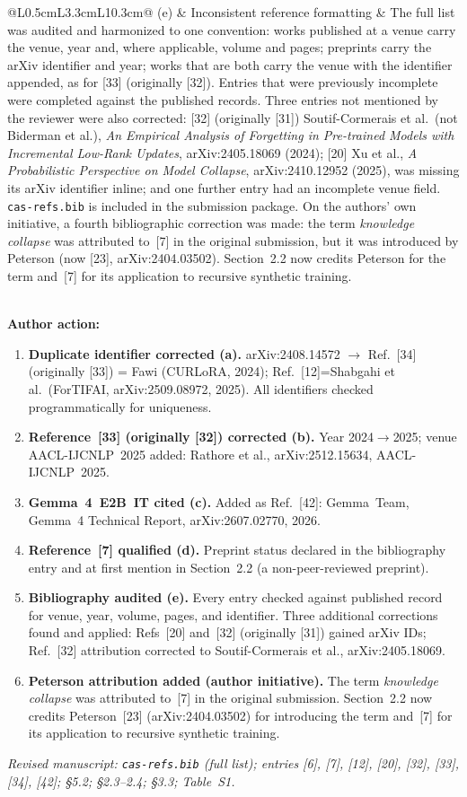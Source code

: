 \documentclass[11pt,a4paper]{article}
\newcommand{\newtext}[1]{#1}
\newcommand{\arhead}[1]{\medskip\noindent\textbf{#1}\par\smallskip}
\newcommand{\newtext}[1]{\textcolor{chgcolor}{``#1''}}
\newcommand{\msloc}[1]{%
  \smallskip\noindent\textit{Revised manuscript: #1}\par%
}
\begin{document}
\begin{longtable}{@{}L{0.5cm}L{3.3cm}L{10.3cm}@{}}
(e) & Inconsistent reference formatting &
The full list was audited and harmonized to one convention: works
published at a venue carry the venue, year and, where applicable, volume
and pages; preprints carry the arXiv identifier and year; works that are
both carry the venue with the identifier appended, as for [33] (originally [32]). Entries
that were previously incomplete were completed against the published
records. Three entries not mentioned by the reviewer were also corrected:
[32] (originally [31]) Soutif-Cormerais et al.\ (not Biderman et al.), \emph{An Empirical
Analysis of Forgetting in Pre-trained Models with Incremental Low-Rank
Updates}, arXiv:2405.18069 (2024); [20] Xu et al., \emph{A Probabilistic
Perspective on Model Collapse}, arXiv:2410.12952 (2025), was missing its
arXiv identifier inline; and one further entry had an incomplete venue
field. \texttt{cas-refs.bib} is included in the submission package.
On the authors' own initiative, a fourth bibliographic correction was
made: the term \emph{knowledge collapse} was attributed to~[7] in the
original submission, but it was introduced by Peterson (now [23],
arXiv:2404.03502). Section~2.2 now credits Peterson for the term
and~[7] for its application to recursive synthetic training. \\\
\end{longtable}

\arhead{Author action:}
\begin{enumerate}[leftmargin=1.4em,itemsep=0.3em]
\item \textbf{Duplicate identifier corrected (a).}
      arXiv:2408.14572 $\to$ Ref.~[34] (originally [33]) = Fawi (CURLoRA, 2024);
      Ref.~[12]=Shabgahi et al.\ (ForTIFAI, arXiv:2509.08972, 2025).
      All identifiers checked programmatically for uniqueness.
\item \textbf{Reference~[33] (originally [32]) corrected (b).}
      Year 2024$\to$2025; venue AACL-IJCNLP~2025 added:
      \newtext{Rathore et al., arXiv:2512.15634, AACL-IJCNLP~2025.}
\item \textbf{Gemma~4~E2B~IT cited (c).}
      Added as Ref.~[42]: \newtext{Gemma~Team, Gemma~4 Technical
      Report, arXiv:2607.02770, 2026.}
\item \textbf{Reference~[7] qualified (d).}
      Preprint status declared in the bibliography entry and at first
      mention in Section~2.2 (\newtext{a non-peer-reviewed preprint}).
\item \textbf{Bibliography audited (e).}
      Every entry checked against published record for venue, year,
      volume, pages, and identifier. Three additional corrections found
      and applied: Refs~[20] and~[32] (originally [31]) gained arXiv IDs; Ref.~[32]
      attribution corrected to Soutif-Cormerais et al., arXiv:2405.18069.
\item \textbf{Peterson attribution added (author initiative).}
      The term \emph{knowledge collapse} was attributed to~[7] in the
      original submission. Section~2.2 now credits Peterson~[23]
      (arXiv:2404.03502) for introducing the term and~[7] for its
      application to recursive synthetic training.
\end{enumerate}

\msloc{\texttt{cas-refs.bib} (full list); entries [6], [7], [12], [20], [32], [33], [34], [42]; \S5.2; \S2.3--2.4; \S3.3; Table~S1.}
\end{document}
